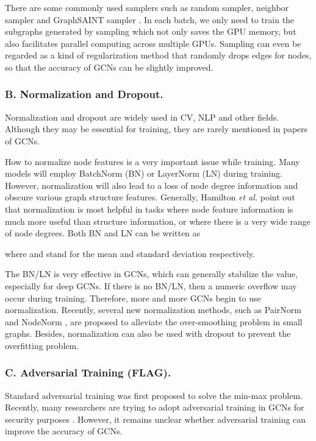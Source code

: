 \documentclass[runningheads]{llncs}
\begin{document}
There are some commonly used samplers such as random sampler, neighbor
sampler \cite{hamilton2017inductive} and GraphSAINT sampler \cite{zeng2019graphsaint}. In each batch, we only
need to train the subgraphs generated by sampling which not only saves the 
GPU memory, but also facilitates parallel computing across
multiple GPUs. Sampling can even be regarded as a kind of regularization method that randomly drops edges for nodes, so that the accuracy of GCNs can be slightly improved.



\subsubsection{B. Normalization and
Dropout.}
Normalization and dropout \cite{srivastava2014dropout} are widely used in CV, NLP and other fields.
Although they may be essential for training, they are rarely mentioned
in papers of GCNs. 

How to normalize node features  is a very important issue while training. Many models will employ  BatchNorm (BN) \cite{ioffe2015batch} or LayerNorm (LN) \cite{ba2016layer} during training. However, normalization will also lead to a loss of node degree information and obscure various graph structure
features. Generally, Hamilton \textsl{et al.} \cite{hamilton2020graph} point out that normalization is most helpful in tasks where node feature information is much
more useful than structure information, or where there is a very wide range of node degrees. Both BN and LN can be written as

where  and  stand for the mean and standard deviation respectively.

The BN/LN is very effective in GCNs, which can generally
stabilize the value, especially for deep GCNs. If there is
no BN/LN, then a numeric overflow may occur during training. Therefore, more and more GCNs
begin to use normalization. Recently, several new normalization methods, such as PairNorm \cite{zhao2019pairnorm} and NodeNorm \cite{zhou2020understanding}, are proposed to alleviate the over-smoothing problem in small graphs. Besides, normalization can also be used with dropout to prevent the overfitting problem.



\subsubsection{C. Adversarial Training
(FLAG).}
Standard adversarial training was first proposed to solve the min-max problem. Recently, many researchers are trying to
adopt adversarial training in GCNs for security purposes \cite{bojchevski2019adversarial,zhang2020gnnguard}. However, it remains unclear whether adversarial training can improve the accuracy of GCNs.
\end{document}
